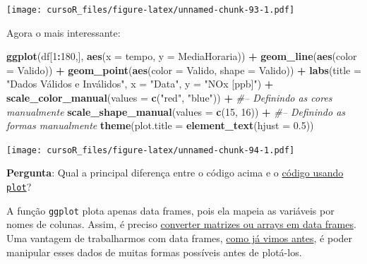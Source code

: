 \documentclass[]{book}
\newenvironment{Shaded}{\begin{snugshade}}{\end{snugshade}}
\newcommand{\KeywordTok}[1]{\textcolor[rgb]{0.13,0.29,0.53}{\textbf{#1}}}
\newcommand{\DataTypeTok}[1]{\textcolor[rgb]{0.13,0.29,0.53}{#1}}
\newcommand{\DecValTok}[1]{\textcolor[rgb]{0.00,0.00,0.81}{#1}}
\newcommand{\FloatTok}[1]{\textcolor[rgb]{0.00,0.00,0.81}{#1}}
\newcommand{\StringTok}[1]{\textcolor[rgb]{0.31,0.60,0.02}{#1}}
\newcommand{\CommentTok}[1]{\textcolor[rgb]{0.56,0.35,0.01}{\textit{#1}}}
\newcommand{\OperatorTok}[1]{\textcolor[rgb]{0.81,0.36,0.00}{\textbf{#1}}}
\newcommand{\NormalTok}[1]{#1}
\theoremstyle{definition}
\theoremstyle{definition}
\theoremstyle{definition}
\theoremstyle{remark}
\begin{document}
\texttt{[image: cursoR\_files/figure-latex/unnamed-chunk-93-1.pdf]}

Agora o mais interessante:

\begin{Shaded}
\begin{Highlighting}[]
\KeywordTok{ggplot}\NormalTok{(df[}\DecValTok{1}\OperatorTok{:}\DecValTok{180}\NormalTok{,], }\KeywordTok{aes}\NormalTok{(}\DataTypeTok{x =}\NormalTok{ tempo, }\DataTypeTok{y =}\NormalTok{ MediaHoraria)) }\OperatorTok{+}\StringTok{ }
\StringTok{  }\KeywordTok{geom_line}\NormalTok{(}\KeywordTok{aes}\NormalTok{(}\DataTypeTok{color =}\NormalTok{ Valido)) }\OperatorTok{+}
\StringTok{  }\KeywordTok{geom_point}\NormalTok{(}\KeywordTok{aes}\NormalTok{(}\DataTypeTok{color =}\NormalTok{ Valido, }\DataTypeTok{shape =}\NormalTok{ Valido)) }\OperatorTok{+}
\StringTok{  }\KeywordTok{labs}\NormalTok{(}\DataTypeTok{title =} \StringTok{"Dados Válidos e Inválidos"}\NormalTok{, }\DataTypeTok{x =} \StringTok{"Data"}\NormalTok{, }\DataTypeTok{y =} \StringTok{"NOx [ppb]"}\NormalTok{) }\OperatorTok{+}
\StringTok{  }\KeywordTok{scale_color_manual}\NormalTok{(}\DataTypeTok{values =} \KeywordTok{c}\NormalTok{(}\StringTok{"red"}\NormalTok{, }\StringTok{"blue"}\NormalTok{)) }\OperatorTok{+}\StringTok{ }\CommentTok{#-- Definindo as cores manualmente}
\StringTok{  }\KeywordTok{scale_shape_manual}\NormalTok{(}\DataTypeTok{values =} \KeywordTok{c}\NormalTok{(}\DecValTok{15}\NormalTok{, }\DecValTok{16}\NormalTok{)) }\OperatorTok{+}\StringTok{ }\CommentTok{#-- Definindo as formas manualmente}
\StringTok{  }\KeywordTok{theme}\NormalTok{(}\DataTypeTok{plot.title =} \KeywordTok{element_text}\NormalTok{(}\DataTypeTok{hjust =} \FloatTok{0.5}\NormalTok{))}
\end{Highlighting}
\end{Shaded}

\texttt{[image: cursoR\_files/figure-latex/unnamed-chunk-94-1.pdf]}

{\textbf{Pergunta}: Qual a principal diferença entre o código acima e o
\protect\hyperlink{plot_base}{código usando \texttt{plot}}?}

A função \texttt{ggplot} plota apenas data frames, pois ela mapeia as
variáveis por nomes de colunas. Assim, é preciso
\protect\hyperlink{convert_df}{converter matrizes ou arrays em data
frames}.\\
Uma vantagem de trabalharmos com data frames,
\protect\hyperlink{processing_dfs}{como já vimos antes}, é poder
manipular esses dados de muitas formas possíveis antes de plotá-los.
\end{document}
